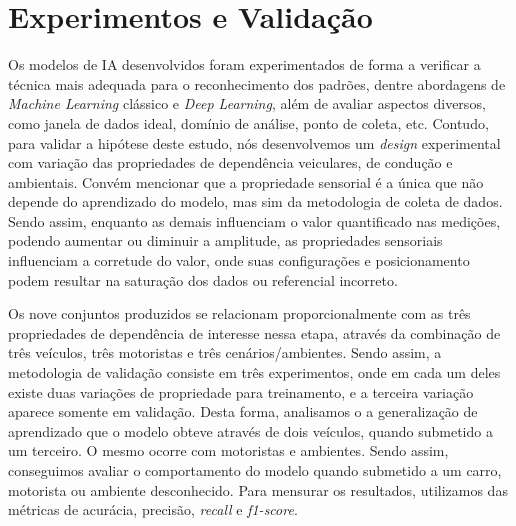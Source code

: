\section{Experimentos e Validação}

Os modelos de IA desenvolvidos foram experimentados de forma a verificar a técnica mais adequada para o reconhecimento dos padrões, dentre abordagens de \textit{Machine Learning} clássico e \textit{Deep Learning}, além de avaliar aspectos diversos, como janela de dados ideal, domínio de análise, ponto de coleta, etc. Contudo, para validar a hipótese deste estudo, nós desenvolvemos um \textit{design} experimental com variação das propriedades de dependência veiculares, de condução e ambientais. Convém mencionar que a propriedade sensorial é a única que não depende do aprendizado do modelo, mas sim da metodologia de coleta de dados. Sendo assim, enquanto as demais influenciam o valor quantificado nas medições, podendo aumentar ou diminuir a amplitude, as propriedades sensoriais influenciam a corretude do valor, onde suas configurações e posicionamento podem resultar na saturação dos dados ou referencial incorreto.
 
Os nove conjuntos produzidos se relacionam proporcionalmente com as três propriedades de dependência de interesse nessa etapa, através da combinação de três veículos, três motoristas e três cenários/ambientes. Sendo assim, a metodologia de validação consiste em três experimentos, onde em cada um deles existe duas variações de propriedade para treinamento, e a terceira variação aparece somente em validação. Desta forma, analisamos o a generalização de aprendizado que o modelo obteve através de dois veículos, quando submetido a um terceiro. O mesmo ocorre com motoristas e ambientes. Sendo assim, conseguimos avaliar o comportamento do modelo quando submetido a um carro, motorista ou ambiente desconhecido. Para mensurar os resultados, utilizamos das métricas de acurácia, precisão, \textit{recall} e \textit{f1-score}.